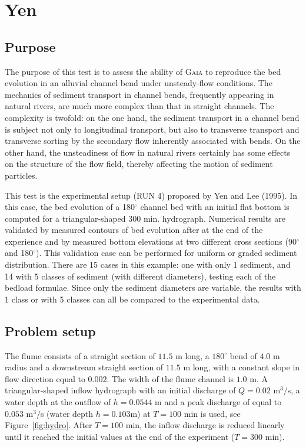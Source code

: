 \chapter{Yen}
%

%
\section{Purpose}
%
The purpose of this test is to assess the ability of \textsc{Gaia} to reproduce the bed evolution in an alluvial channel bend under unsteady-flow conditions.
The mechanics of sediment transport in channel bends, frequently appearing in natural rivers, are much more complex than that in straight channels.
The complexity is twofold: on the one hand, the sediment transport in a channel bend is subject not only to longitudinal transport,
but also to transverse transport and transverse sorting by the secondary flow inherently associated with bends.
On the other hand, the unsteadiness of flow in natural rivers certainly has some effects on the structure of the flow field,
thereby affecting the motion of sediment particles.

This test is the experimental setup (RUN 4) proposed by Yen and Lee (1995).
In this case, the bed evolution of a 180$^{\circ}$ channel bed with an initial flat bottom is computed for a triangular-shaped $300$ min. hydrograph.
Numerical results are validated by measured contours of bed evolution after at the end of the experience and by measured bottom elevations at
two different cross sections (90$^{\circ}$ and 180$^{\circ}$). This validation case can be performed for uniform or graded sediment distribution.
There are 15 cases in this example: one with only 1 sediment, and 14 with 5 classes of sediment (with different diameters), testing each of the bedload formulae.
Since only the sediment diameters are variable, the results with 1 class or with 5 classes can all be compared to the experimental data.
%
\section{Problem setup}
%
The flume consists of a straight section of $11.5$ m long, a $180^{\circ}$ bend of $4.0$ m radius and a downstream straight section of
$11.5$ m long, with a constant slope in flow direction equal to $0.002$. The width of the flume channel is $1.0$ m.
A triangular-shaped inflow hydrograph with an initial discharge of $Q=0.02$ m$^3/$s, a water depth at the outflow of $h = 0.0544$ m
and a peak discharge of equal to $0.053$ m$^3/$s (water depth $h=0.103$m) at $T = 100$ min
is used, see Figure~\ref{fig:hydro}. After $T = 100$ min, the inflow discharge is reduced linearly until
it reached the initial values at the end of the experiment ($T = 300$ min).

